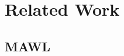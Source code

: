 \documentclass[thesis.tex]{subfiles}
\begin{document}
\chapter{Related Work}
\section{MAWL}
\cite{MAWL}
\cite{BIGWIG}
\cite{HASKELL}
\cite{WASH}
\cite{ML}
\end{document}

